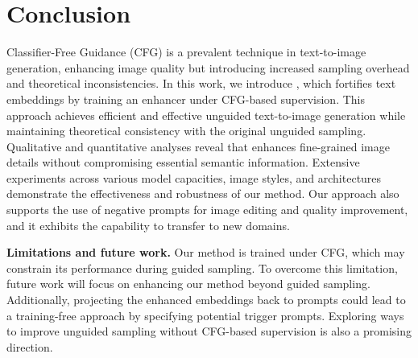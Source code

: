\section{Conclusion}
Classifier-Free Guidance (CFG) is a prevalent technique in text-to-image generation, enhancing image quality but introducing increased sampling overhead and theoretical inconsistencies. In this work, we introduce \ourName, which fortifies text embeddings by training an enhancer under CFG-based supervision. This approach achieves efficient and effective unguided text-to-image generation while maintaining theoretical consistency with the original unguided sampling. Qualitative and quantitative analyses reveal that \ourName enhances fine-grained image details without compromising essential semantic information. Extensive experiments across various model capacities, image styles, and architectures demonstrate the effectiveness and robustness of our method. Our approach also supports the use of negative prompts for image editing and quality improvement, and it exhibits the capability to transfer to new domains. 

\textbf{Limitations and future work.}
Our method is trained under CFG, which may constrain its performance during guided sampling. To overcome this limitation, future work will focus on enhancing our method beyond guided sampling. Additionally, projecting the enhanced embeddings back to prompts could lead to a training-free approach by specifying potential trigger prompts. Exploring ways to improve unguided sampling without CFG-based supervision is also a promising direction. 
